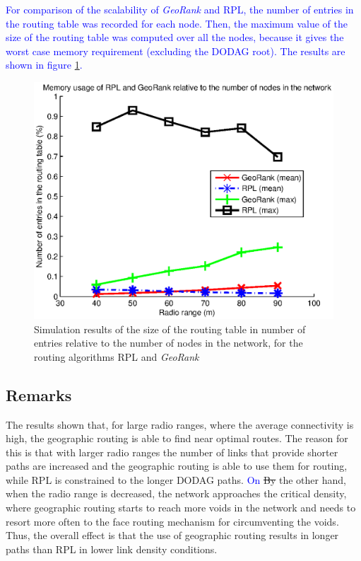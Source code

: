 \documentclass[authoryear,preprint,review,12pt]{elsarticle}
\newcommand{\rev}{\textcolor{blue}}
\begin{document}
\rev{For comparison of the scalability of \textit{GeoRank} and RPL, the number of entries in the routing table was recorded for each node. Then, the maximum value of the size of the routing table was computed over all the nodes, because it gives the worst case memory requirement (excluding the DODAG root). The results are shown in figure \ref{sim_results2}.}

\begin{figure}
\centering
\includegraphics[width=1\textwidth]{figures/mem_usage_range.eps}
\caption{Simulation results of the size of the routing table in number of entries relative to the number of nodes in the network, for the routing algorithms RPL and \textit{GeoRank}}
\label{sim_results2}
\end{figure}

\subsection{Remarks}

The results shown that, for large radio ranges, where the average connectivity is high, the geographic routing is able to find near optimal routes. The reason for this is that with larger radio ranges the number of links that provide shorter paths are increased and the geographic routing is able to use them for routing, while RPL is constrained to the longer DODAG paths. \rev{On} \sout{By} the other hand, when the radio range is decreased, the network approaches the critical density, where geographic routing starts to reach more voids in the network and needs to resort more often to the face routing mechanism for circumventing the voids. Thus, the overall effect is that the use of geographic routing results in longer paths than RPL in lower link density conditions.
\end{document}
